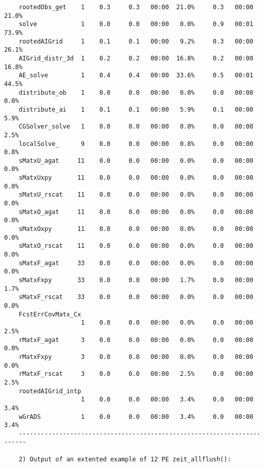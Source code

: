 \begin{verbatim}
    rootedObs_get    1    0.3     0.3   00:00  21.0%     0.3   00:00  21.0%
    solve            1    0.0     0.0   00:00   0.0%     0.9   00:01  73.9%
    rootedAIGrid     1    0.1     0.1   00:00   9.2%     0.3   00:00  26.1%
    AIGrid_distr_3d  1    0.2     0.2   00:00  16.8%     0.2   00:00  16.8%
    AE_solve         1    0.4     0.4   00:00  33.6%     0.5   00:01  44.5%
    distribute_ob    1    0.0     0.0   00:00   0.0%     0.0   00:00   0.0%
    distribute_ai    1    0.1     0.1   00:00   5.9%     0.1   00:00   5.9%
    CGSolver_solve   1    0.0     0.0   00:00   0.0%     0.0   00:00   2.5%
    localSolve_      9    0.0     0.0   00:00   0.8%     0.0   00:00   0.8%
    sMatxU_agat     11    0.0     0.0   00:00   0.0%     0.0   00:00   0.0%
    sMatxUxpy       11    0.0     0.0   00:00   0.0%     0.0   00:00   0.0%
    sMatxU_rscat    11    0.0     0.0   00:00   0.0%     0.0   00:00   0.0%
    sMatxO_agat     11    0.0     0.0   00:00   0.0%     0.0   00:00   0.0%
    sMatxOxpy       11    0.0     0.0   00:00   0.0%     0.0   00:00   0.0%
    sMatxO_rscat    11    0.0     0.0   00:00   0.0%     0.0   00:00   0.0%
    sMatxF_agat     33    0.0     0.0   00:00   0.0%     0.0   00:00   0.0%
    sMatxFxpy       33    0.0     0.0   00:00   1.7%     0.0   00:00   1.7%
    sMatxF_rscat    33    0.0     0.0   00:00   0.0%     0.0   00:00   0.0%
    FcstErrCovMatx_Cx
                     1    0.0     0.0   00:00   0.0%     0.0   00:00   2.5%
    rMatxF_agat      3    0.0     0.0   00:00   0.0%     0.0   00:00   0.0%
    rMatxFxpy        3    0.0     0.0   00:00   0.0%     0.0   00:00   0.0%
    rMatxF_rscat     3    0.0     0.0   00:00   2.5%     0.0   00:00   2.5%
    rootedAIGrid_intp
                     1    0.0     0.0   00:00   3.4%     0.0   00:00   3.4%
    wGrADS           1    0.0     0.0   00:00   3.4%     0.0   00:00   3.4%
    ------------------------------------------------------------------------
    
    2) Output of an extented example of 12 PE zeit_allflush():
   

\end{verbatim}
